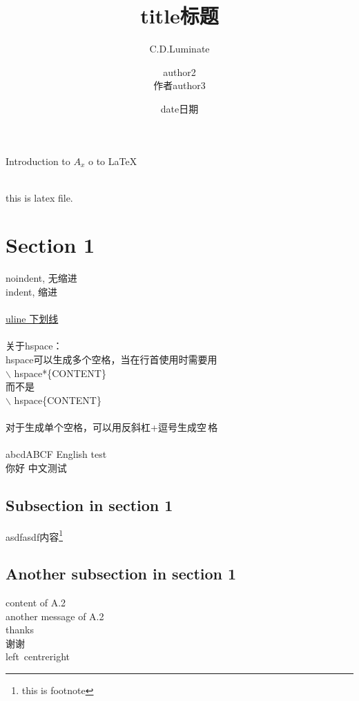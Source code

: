 \documentclass{article}
\title{title标题}
\author{C.D.Luminate \and author2\\作者author3}
\date{date日期}
\begin{document}
\begin{CJK}{UTF8}{gbsn}

\maketitle
\fussy
Introduction to $A_x$ o to \LaTeX \LaTeXe\\
\tableofcontents

\hrulefill\\
this is latex file.

\section{Section 1}
\noindent noindent, 无缩进\\
\indent indent, 缩进\\
\\
\uline{uline 下划线}\\
\\
\hspace*{1cm}关于hspace：\\
	hspace可以生成多个空格，当在行首使用时需要用\\
	\hspace{1cm} $\backslash$ hspace*\{CONTENT\}\\
	而不是\\
	\hspace{1cm} $\backslash$ hspace\{CONTENT\}\\
\\
对于生成单个空格，可以用反斜杠+逗号生成空\,格\\
\\
abcdABCF English test\\
你好 中文测试\\

\subsection{Subsection in section 1}
asdfasdf内容\footnote{this is footnote}

\subsection{Another subsection in section 1}
content of A.2\\
\hspace{2cm}another message of A.2\\
thanks\\
谢谢\\
left\hfill\ centre\hfill right


\end{CJK}
\end{document}
